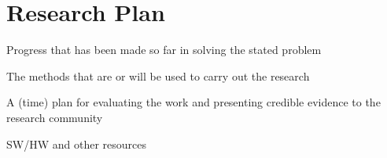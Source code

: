 \chapter{Research Plan}

Progress that has been made so far in solving the stated problem

The methods that are or will be used to carry out the research

A (time) plan for evaluating the work and presenting credible evidence to the 
research community

SW/HW and other resources